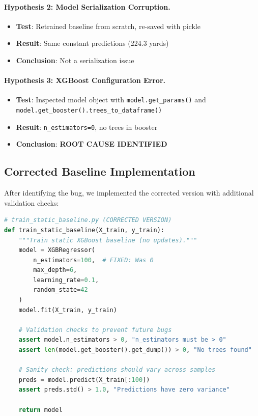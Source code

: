 \paragraph{Hypothesis 2: Model Serialization Corruption.}
\begin{itemize}
\item \textbf{Test}: Retrained baseline from scratch, re-saved with pickle
\item \textbf{Result}: Same constant predictions (224.3 yards)
\item \textbf{Conclusion}: Not a serialization issue
\end{itemize}

\paragraph{Hypothesis 3: XGBoost Configuration Error.}
\begin{itemize}
\item \textbf{Test}: Inspected model object with \texttt{model.get\_params()} and\\
\texttt{model.get\_booster().trees\_to\_dataframe()}
\item \textbf{Result}: \texttt{n\_estimators=0}, no trees in booster
\item \textbf{Conclusion}: \textbf{ROOT CAUSE IDENTIFIED}
\end{itemize}

\subsection{Corrected Baseline Implementation}

After identifying the bug, we implemented the corrected version with additional validation checks:

\begin{lstlisting}[language=Python,caption={Corrected Static Baseline Code (Nov 12)}]
# train_static_baseline.py (CORRECTED VERSION)
def train_static_baseline(X_train, y_train):
    """Train static XGBoost baseline (no updates)."""
    model = XGBRegressor(
        n_estimators=100,  # FIXED: Was 0
        max_depth=6,
        learning_rate=0.1,
        random_state=42
    )
    model.fit(X_train, y_train)

    # Validation checks to prevent future bugs
    assert model.n_estimators > 0, "n_estimators must be > 0"
    assert len(model.get_booster().get_dump()) > 0, "No trees found"

    # Sanity check: predictions should vary across samples
    preds = model.predict(X_train[:100])
    assert preds.std() > 1.0, "Predictions have zero variance"

    return model
\end{lstlisting}


